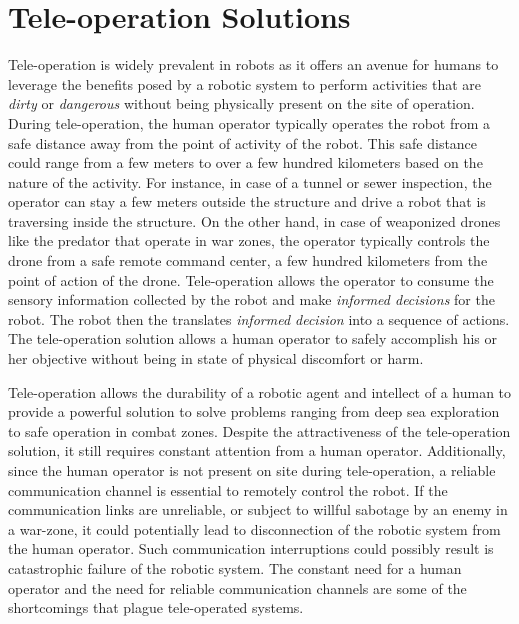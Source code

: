 \section{Tele-operation Solutions}

Tele-operation is widely prevalent in robots as it offers an avenue for humans to leverage the benefits posed by a robotic system to perform activities 
that are \emph{dirty} or \emph{dangerous} without being physically present on the site of operation. During tele-operation, the human operator 
typically operates the robot from a safe distance away from the point of activity of the robot. This safe distance could range from a few meters to over a few hundred kilometers based on the nature of the activity. For instance, in case of a tunnel or sewer inspection, the operator can stay a few meters outside the structure and drive a robot that is traversing inside the structure. On the other hand, in case of weaponized drones like the predator \cite{predator} that operate in war zones, the operator typically controls the drone from a safe remote command center, a few hundred kilometers from the point of action of the drone. Tele-operation allows the operator to consume the sensory information collected by the robot and make \emph{informed decisions} for the robot. The robot then the translates \emph{informed decision} into a sequence of actions. The tele-operation solution allows a human operator to safely accomplish his or her objective 
without being in state of physical discomfort or harm. 

Tele-operation allows the durability of a robotic agent and intellect of a human to provide a powerful solution to solve problems ranging from deep sea exploration to safe operation in combat zones. Despite the attractiveness of the tele-operation solution, it still requires constant attention from
a human operator. Additionally, since the human operator is not present on site during tele-operation, a reliable communication channel is essential to remotely control the robot. If the communication links are unreliable, or subject to willful sabotage by an enemy in a war-zone, it could potentially lead to disconnection of the robotic system from the human operator. Such communication interruptions could possibly result is catastrophic failure of the robotic system. The constant need for a human operator and the need for reliable communication channels are some of the shortcomings that plague tele-operated systems.

